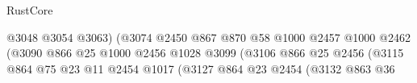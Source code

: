 \begin{lexlean}{RustCore}
\begin{coremodule}
                                                              @3048
                                                              @3054
                                                              @3063)
                                                            (@3074
                                                              @2450
                                                              @867
                                                              @870
                                                              @58
                                                              @1000
                                                              @2457
                                                              @1000
                                                              @2462
                                                              (@3090
                                                                @866
                                                                @25
                                                                @1000
                                                                @2456
                                                                @1028
                                                                @3099
                                                                (@3106
                                                                  @866
                                                                  @25
                                                                  @2456
                                                                  (@3115
                                                                    @864
                                                                    @75
                                                                    @23
                                                                    @11
                                                                    @2454
                                                                    @1017
                                                                    (@3127
                                                                      @864
                                                                      @23
                                                                      @2454
                                                                      (@3132
                                                                        @863
                                                                        @36

\end{coremodule}
\end{lexlean}
